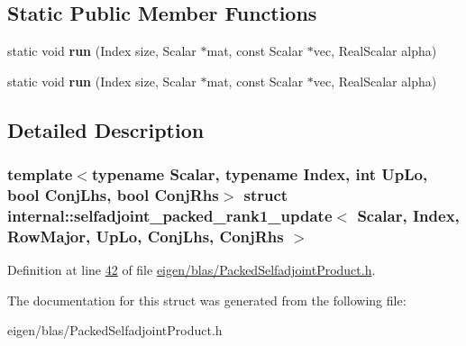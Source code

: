 \subsection*{Static Public Member Functions}
\begin{DoxyCompactItemize}
\item 
\mbox{\label{structinternal_1_1selfadjoint__packed__rank1__update_3_01_scalar_00_01_index_00_01_row_major_00_9e7850f711875a82e66e0710a9772df5_a7e831a9437e04d28737dddacec8f1b97}} 
static void {\bfseries run} (Index size, Scalar $\ast$mat, const Scalar $\ast$vec, Real\+Scalar alpha)
\item 
\mbox{\label{structinternal_1_1selfadjoint__packed__rank1__update_3_01_scalar_00_01_index_00_01_row_major_00_9e7850f711875a82e66e0710a9772df5_a7e831a9437e04d28737dddacec8f1b97}} 
static void {\bfseries run} (Index size, Scalar $\ast$mat, const Scalar $\ast$vec, Real\+Scalar alpha)
\end{DoxyCompactItemize}


\subsection{Detailed Description}
\subsubsection*{template$<$typename Scalar, typename Index, int Up\+Lo, bool Conj\+Lhs, bool Conj\+Rhs$>$\newline
struct internal\+::selfadjoint\+\_\+packed\+\_\+rank1\+\_\+update$<$ Scalar, Index, Row\+Major, Up\+Lo, Conj\+Lhs, Conj\+Rhs $>$}



Definition at line \hyperlink{eigen_2blas_2_packed_selfadjoint_product_8h_source_l00042}{42} of file \hyperlink{eigen_2blas_2_packed_selfadjoint_product_8h_source}{eigen/blas/\+Packed\+Selfadjoint\+Product.\+h}.



The documentation for this struct was generated from the following file\+:\begin{DoxyCompactItemize}
\item 
eigen/blas/\+Packed\+Selfadjoint\+Product.\+h\end{DoxyCompactItemize}

